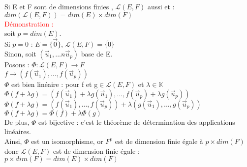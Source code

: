 \documentclass{article}
\begin{document}
Si E et F sont de dimensions finies , $\mathcal L (E,F)$ aussi et : \\
$dim(\mathcal L(E,F))= dim(E) \times dim(F)$ \\
\textcolor{red}{Démonstration :} \\
soit $p=dim(E)$. \\
Si $p=0$ : $E= \lbrace \vec 0 \rbrace$, $\mathcal L (E,F)= \lbrace \tilde{0} \rbrace$ \\
Sinon,  soit $(\vec u_1,...n  \vec u_p)$ base de E. \\
Posons : $\Phi : \mathcal L(E,F) \rightarrow F$ \\
$f \rightarrow (f(\vec u_1),...,f(\vec u_p))$ \\
$\Phi$ est bien linéaire : pour f et g$\in \mathcal L (E,F)$ et $\lambda \in \mathbb K$ \\
$\Phi (f+ \lambda g)= (f( \vec u_1)+ \lambda g(\vec u_1),...,f(\vec u_p)+ \lambda g(\vec u_p))$ \\
$\Phi (f+ \lambda g)= (f(\vec u_1),...,f(\vec u_p)) + \lambda (g(\vec u_1),...,g(\vec u_p))$ \\
$\Phi (f+ \lambda g)= \Phi (f) + \lambda \Phi(g)$ \\
De plus, $\Phi$ est bijective : c'est le théorème de détermination des applications linéaires. \\
Ainsi, $\Phi$ est un isomorphisme, or $F^p$ est de dimension finie égale à $p \times dim(F)$ donc $\mathcal L (E,F)$ est de dimension finie égale : $p \times dim(F)= dim(E) \times dim(F)$
\end{document}
